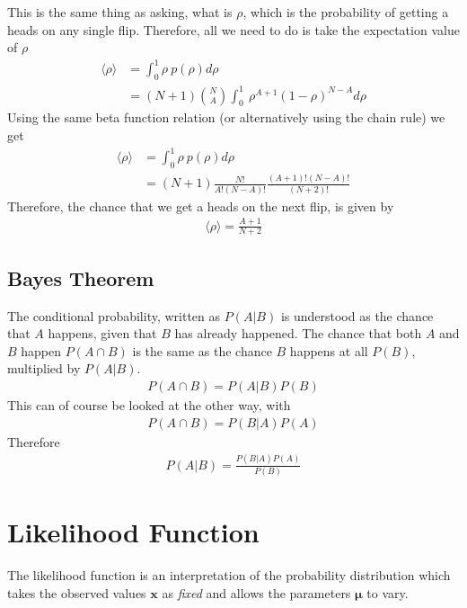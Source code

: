 This is the same thing as asking, what is $\rho$, which is the probability of getting a heads on any single flip. Therefore, all we need to do is take the expectation value of $\rho$
\begin{align}
	\langle \rho\rangle &= \int_0^1\rho ~p(\rho) d\rho\\
	&= (N+1){N\choose A}\int_0^1 ~\rho^{A+1}(1-\rho)^{N-A} d\rho
\end{align}
Using the same beta function relation (or alternatively using the chain rule) we get
\begin{align}
	\langle \rho\rangle &= \int_0^1\rho ~p(\rho) d\rho\\
	&= (N+1)\frac{N!}{A!(N-A)!}\frac{(A+1)!(N-A)!}{(N+2)!}
\end{align}
Therefore, the chance that we get a heads on the next flip, is given by
\begin{align}
	\langle\rho\rangle = \frac{A+1}{N+2}
\end{align}



\subsection{Bayes Theorem}
The conditional probability, written as $P(A|B)$ is understood as the chance that $A$ happens, given that $B$ has already happened. The chance that both $A$ and $B$ happen $P(A \cap B)$ is the same as the chance $B$ happens at all $P(B)$, multiplied by $P(A|B)$.
\begin{align}
P(A\cap B) = P(A|B)P(B)
\end{align}
This can of course be looked at the other way, with
\begin{align}
P(A\cap B) = P(B|A)P(A)
\end{align}
Therefore
\begin{align}
P(A|B) = \frac{P(B|A)P(A)}{P(B)}
\end{align}

\section{Likelihood Function}

The likelihood function is an interpretation of the probability distribution which takes the observed values $\textbf{x}$ as \textit{fixed} and allows the parameters $\boldsymbol{\mu}$ to vary.

